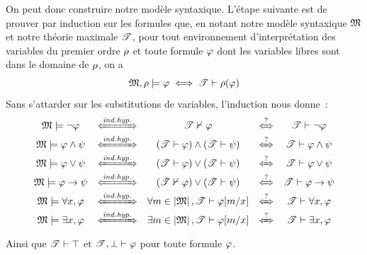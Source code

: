 On peut donc construire notre modèle syntaxique. L'étape suivante est de prouver
par induction sur les formules que, en notant notre modèle syntaxique $\mathfrak{M}$
et notre théorie maximale $\mathscr T$, pour tout environnement d'interprétation des
variables du premier ordre $\rho$ et toute formule $\varphi$ dont les variables
libres sont dans le domaine de $\rho$, on a
\[\mathfrak{M}, \rho \models \varphi \iff \mathscr T \vdash \rho(\varphi)\]
Sans s'attarder sur les substitutions de variables, l'induction nous
donne~:
\[\begin{array}{ccccc}
\varMM \satisf \lnot \varFF 
& \indIff &
\varT \nvdP \varFF & \interIff &
\varT \vdP \lnot\varFF \\
\varMM \satisf \varFF\land \varFP
& \indIff &
(\varT \vdP \varFF) \land (\varT \vdP \varFP)&
\interIff &
\varT \vdP \varFF \land \varFP \\
\varMM \satisf \varFF\lor \varFP
& \indIff &
(\varT \vdP \varFF) \lor (\varT \vdP \varFP)&
\interIff &
\varT \vdP \varFF \lor \varFP \\
\varMM \satisf \varFF\to \varFP
& \indIff &
(\varT \nvdP \varFF) \lor (\varT \vdP \varFP)&
\interIff &
\varT \vdP \varFF \to \varFP \\
\varMM \satisf \forall x, \varFF
& \indIff &
\forall m \in \carMM, \varT \vdP \varFF[m/x]
& \interIff &
\varT \vdP \forall x, \varFF \\
\varMM \satisf \exists x, \varFF
& \indIff &
\exists m \in \carMM, \varT \vdP \varFF[m/x]
& \interIff &
\varT \vdP \exists x, \varFF \\
\end{array}\]
Ainsi que $\mathscr T\vdash\top$ et $\mathscr T,\bot\vdash\varphi$ pour toute formule
$\varphi$.

